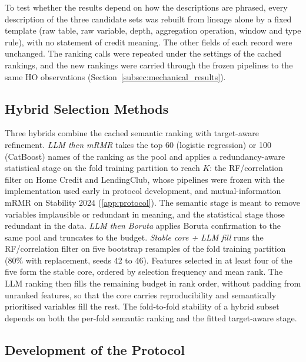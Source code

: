 \documentclass[final,5p,twocolumn]{elsarticle}
\newcommand{\Kfeat}{K}
\begin{document}
To test whether the results depend on how the descriptions are phrased, every description of the three candidate sets was rebuilt from lineage alone by a fixed template (raw table, raw variable, depth, aggregation operation, window and type rule), with no statement of credit meaning. The other fields of each record were unchanged. The ranking calls were repeated under the settings of the cached rankings, and the new rankings were carried through the frozen pipelines to the same HO observations (Section~\ref{subsec:mechanical_results}).

\subsection{Hybrid Selection Methods}
\label{subsec:hybrid_fs}

Three hybrids combine the cached semantic ranking with target-aware refinement. \emph{LLM then mRMR} takes the top 60 (logistic regression) or 100 (CatBoost) names of the ranking as the pool and applies a redundancy-aware statistical stage on the fold training partition to reach $\Kfeat$: the RF/correlation filter on Home Credit and LendingClub, whose pipelines were frozen with the implementation used early in protocol development, and mutual-information mRMR on Stability 2024 (\ref{app:protocol}). The semantic stage is meant to remove variables implausible or redundant in meaning, and the statistical stage those redundant in the data. \emph{LLM then Boruta} applies Boruta confirmation to the same pool and truncates to the budget. \emph{Stable core + LLM fill} runs the RF/correlation filter on five bootstrap resamples of the fold training partition (80\% with replacement, seeds 42 to 46). Features selected in at least four of the five form the stable core, ordered by selection frequency and mean rank. The LLM ranking then fills the remaining budget in rank order, without padding from unranked features, so that the core carries reproducibility and semantically prioritised variables fill the rest. The fold-to-fold stability of a hybrid subset depends on both the per-fold semantic ranking and the fitted target-aware stage.

\subsection{Development of the Protocol}
\label{subsec:protocol_development}
\end{document}

